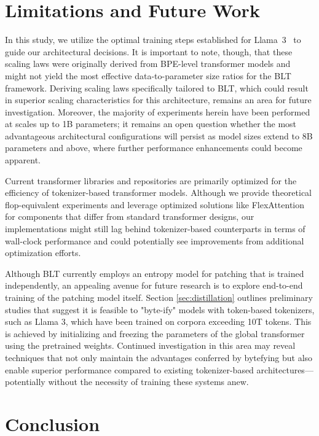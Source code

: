\section{Limitations and Future Work}

In this study, we utilize the optimal training steps established for Llama~3~\citep{dubey2024llama} to guide our architectural decisions. It is important to note, though, that these scaling laws were originally derived from BPE-level transformer models and might not yield the most effective data-to-parameter size ratios for the {\textsc BLT} framework. Deriving scaling laws specifically tailored to {\textsc BLT}, which could result in superior scaling characteristics for this architecture, remains an area for future investigation. Moreover, the majority of experiments herein have been performed at scales up to 1B parameters; it remains an open question whether the most advantageous architectural configurations will persist as model sizes extend to 8B parameters and above, where further performance enhancements could become apparent.

Current transformer libraries and repositories are primarily optimized for the efficiency of tokenizer-based transformer models. Although we provide theoretical flop-equivalent experiments and leverage optimized solutions like FlexAttention for components that differ from standard transformer designs, our implementations might still lag behind tokenizer-based counterparts in terms of wall-clock performance and could potentially see improvements from additional optimization efforts.

Although {\textsc BLT} currently employs an entropy model for patching that is trained independently, an appealing avenue for future research is to explore end-to-end training of the patching model itself. Section \ref{sec:distillation} outlines preliminary studies that suggest it is feasible to "byte-ify" models with token-based tokenizers, such as Llama 3, which have been trained on corpora exceeding 10T tokens. This is achieved by initializing and freezing the parameters of the global transformer using the pretrained weights. Continued investigation in this area may reveal techniques that not only maintain the advantages conferred by bytefying but also enable superior performance compared to existing tokenizer-based architectures—potentially without the necessity of training these systems anew.

\section{Conclusion}
\label{section:conclusion}

